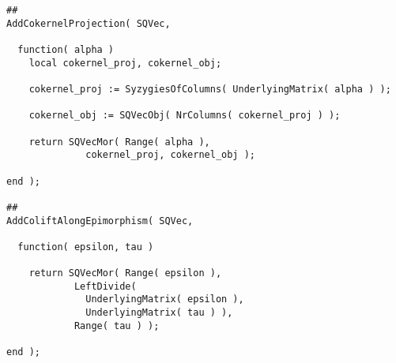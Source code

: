 \begin{small}
\begin{Verbatim}[frame=single]
##
AddCokernelProjection( SQVec,

  function( alpha )
    local cokernel_proj, cokernel_obj;

    cokernel_proj := SyzygiesOfColumns( UnderlyingMatrix( alpha ) );

    cokernel_obj := SQVecObj( NrColumns( cokernel_proj ) );

    return SQVecMor( Range( alpha ), 
              cokernel_proj, cokernel_obj );

end );

##
AddColiftAlongEpimorphism( SQVec,
  
  function( epsilon, tau )
    
    return SQVecMor( Range( epsilon ),
            LeftDivide(
              UnderlyingMatrix( epsilon ),
              UnderlyingMatrix( tau ) ),
            Range( tau ) );
    
end );
\end{Verbatim}
\end{small}
